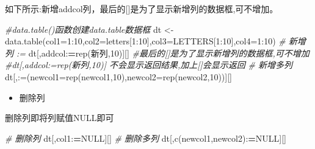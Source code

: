 \documentclass[
]{book}
\newenvironment{Shaded}{\begin{snugshade}}{\end{snugshade}}
\newcommand{\AttributeTok}[1]{\textcolor[rgb]{0.77,0.63,0.00}{#1}}
\newcommand{\CommentTok}[1]{\textcolor[rgb]{0.56,0.35,0.01}{\textit{#1}}}
\newcommand{\ConstantTok}[1]{\textcolor[rgb]{0.00,0.00,0.00}{#1}}
\newcommand{\DecValTok}[1]{\textcolor[rgb]{0.00,0.00,0.81}{#1}}
\newcommand{\ErrorTok}[1]{\textcolor[rgb]{0.64,0.00,0.00}{\textbf{#1}}}
\newcommand{\FunctionTok}[1]{\textcolor[rgb]{0.00,0.00,0.00}{#1}}
\newcommand{\NormalTok}[1]{#1}
\newcommand{\OtherTok}[1]{\textcolor[rgb]{0.56,0.35,0.01}{#1}}
\newcommand{\SpecialCharTok}[1]{\textcolor[rgb]{0.00,0.00,0.00}{#1}}
\newcommand{\StringTok}[1]{\textcolor[rgb]{0.31,0.60,0.02}{#1}}
\providecommand{\tightlist}{%
  \setlength{\itemsep}{0pt}\setlength{\parskip}{0pt}}
\begin{document}
如下所示:新增addcol列，最后的{[}{]}是为了显示新增列的数据框,可不增加。

\begin{Shaded}
\begin{Highlighting}[]
\CommentTok{\#data.table()函数创建data.table数据框}
\NormalTok{dt }\OtherTok{\textless{}{-}} \FunctionTok{data.table}\NormalTok{(}\AttributeTok{col1=}\DecValTok{1}\SpecialCharTok{:}\DecValTok{10}\NormalTok{,}\AttributeTok{col2=}\NormalTok{letters[}\DecValTok{1}\SpecialCharTok{:}\DecValTok{10}\NormalTok{],}\AttributeTok{col3=}\NormalTok{LETTERS[}\DecValTok{1}\SpecialCharTok{:}\DecValTok{10}\NormalTok{],}\AttributeTok{col4=}\DecValTok{1}\SpecialCharTok{:}\DecValTok{10}\NormalTok{)}
\CommentTok{\# 新增列 :=}
\NormalTok{dt[,addcol}\SpecialCharTok{:}\ErrorTok{=}\FunctionTok{rep}\NormalTok{(}\StringTok{\textquotesingle{}新列\textquotesingle{}}\NormalTok{,}\DecValTok{10}\NormalTok{)][] }\CommentTok{\#最后的[]是为了显示新增列的数据框,可不增加}
\CommentTok{\#dt[,addcol:=rep(\textquotesingle{}新列\textquotesingle{},10)] 不会显示返回结果,加上[]会显示返回}
\CommentTok{\# 新增多列}
\NormalTok{dt[,}\StringTok{\textasciigrave{}}\AttributeTok{:=}\StringTok{\textasciigrave{}}\NormalTok{(}\AttributeTok{newcol1=}\FunctionTok{rep}\NormalTok{(}\StringTok{\textquotesingle{}newcol1\textquotesingle{}}\NormalTok{,}\DecValTok{10}\NormalTok{),}\AttributeTok{newcol2=}\FunctionTok{rep}\NormalTok{(}\StringTok{\textquotesingle{}newcol2\textquotesingle{}}\NormalTok{,}\DecValTok{10}\NormalTok{))][]}
\end{Highlighting}
\end{Shaded}

\begin{itemize}
\tightlist
\item
  删除列
\end{itemize}

删除列即将列赋值NULL即可

\begin{Shaded}
\begin{Highlighting}[]
\CommentTok{\# 删除列}
\NormalTok{dt[,col1}\SpecialCharTok{:}\ErrorTok{=}\ConstantTok{NULL}\NormalTok{][]}
\CommentTok{\# 删除多列}
\NormalTok{dt[,}\FunctionTok{c}\NormalTok{(}\StringTok{\textquotesingle{}newcol1\textquotesingle{}}\NormalTok{,}\StringTok{\textquotesingle{}newcol2\textquotesingle{}}\NormalTok{)}\SpecialCharTok{:}\ErrorTok{=}\ConstantTok{NULL}\NormalTok{][]}
\end{Highlighting}
\end{Shaded}
\end{document}
